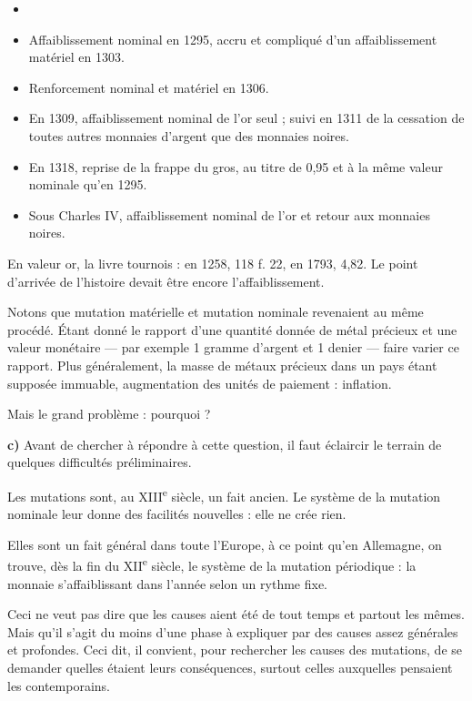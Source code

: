 \documentclass[french,twoside]{book} %
\newcommand{\labelchar}[1]{{\color{rubric}\bf #1}}
\begin{document}
\begin{itemize}[itemsep=0pt,]
\item[] \hspace{-1.5em}{\bfseries En bref, cette histoire complexe peut être résumée ainsi :}
\item Affaiblissement nominal en 1295, accru et compliqué d’un affaiblissement matériel en 1303.
\item Renforcement nominal et matériel en 1306.
\item En 1309, affaiblissement nominal de l’or seul ; suivi en 1311 de la cessation de toutes autres monnaies d’argent que des monnaies noires.
\item En 1318, reprise de la frappe du gros, au titre de 0,95 et à la même valeur nominale qu’en 1295.
\item Sous Charles IV, affaiblissement nominal de l’or et retour aux monnaies noires.
\end{itemize}
\noindent En valeur or, la livre tournois : en 1258, 118 f. 22, en 1793, 4,82. Le point d’arrivée de l’histoire devait être encore l’affaiblissement.\par
Notons que mutation matérielle et mutation nominale revenaient au même procédé. Étant donné le rapport d’une quantité donnée de métal précieux et une valeur monétaire — par exemple 1 gramme d’argent et 1 denier — faire varier ce rapport. Plus généralement, la masse de métaux précieux dans un pays étant supposée immuable, augmentation des unités de paiement : inflation.\par
Mais le grand problème : pourquoi ?\par
\labelchar{c)} Avant de chercher à répondre à cette question, il faut éclaircir le terrain de quelques difficultés préliminaires.\par
Les mutations sont, au XIII\textsuperscript{e} siècle, un fait ancien. Le système de la mutation nominale leur donne des facilités nouvelles : elle ne crée rien.\par
Elles sont un fait général dans toute l’Europe, à ce point qu’en Allemagne, on trouve, dès la fin du XII\textsuperscript{e} siècle, le système de la mutation périodique : la monnaie s’affaiblissant dans l’année selon un rythme fixe.\par
Ceci ne veut pas dire que les causes aient été de tout temps et partout les mêmes. Mais qu’il s’agit du moins d’une phase à expliquer par des causes assez générales et profondes. Ceci dit, il convient, pour rechercher les causes des mutations, de se demander quelles étaient leurs conséquences, surtout celles auxquelles pensaient les contemporains.\par
\end{document}
